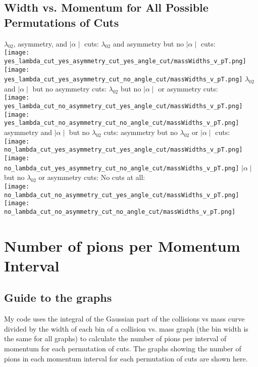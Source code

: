 \documentclass[11pt]{article}
\begin{document}
\subsection{Width vs. Momentum for All Possible Permutations of Cuts}%
\begin{frame}{}
$\lambda_{02}$, asymmetry, and $\mid\alpha\mid$ cuts:
\noindent\hspace{1 cm}$\lambda_{02}$ and asymmetry but no $\mid\alpha\mid$ cuts:\\
\texttt{[image: yes\_lambda\_cut\_yes\_asymmetry\_cut\_yes\_angle\_cut/massWidths\_v\_pT.png]}
\texttt{[image: yes\_lambda\_cut\_yes\_asymmetry\_cut\_no\_angle\_cut/massWidths\_v\_pT.png]}
$\lambda_{02}$ and $\mid\alpha\mid$ but no asymmetry cuts:
\noindent\hspace{1 cm}$\lambda_{02}$ but no $\mid\alpha\mid$ or asymmetry cuts:\\
\texttt{[image: yes\_lambda\_cut\_no\_asymmetry\_cut\_yes\_angle\_cut/massWidths\_v\_pT.png]}
\texttt{[image: yes\_lambda\_cut\_no\_asymmetry\_cut\_no\_angle\_cut/massWidths\_v\_pT.png]}
asymmetry and $\mid\alpha\mid$ but no $\lambda_{02}$ cuts:
\noindent\hspace{1 cm}asymmetry but no $\lambda_{02}$ or $\mid\alpha\mid$ cuts:\\
\texttt{[image: no\_lambda\_cut\_yes\_asymmetry\_cut\_yes\_angle\_cut/massWidths\_v\_pT.png]}
\texttt{[image: no\_lambda\_cut\_yes\_asymmetry\_cut\_no\_angle\_cut/massWidths\_v\_pT.png]}
$\mid\alpha\mid$ but no $\lambda_{02}$ or asymmetry cuts:
\noindent\hspace{1 cm} No cuts at all:\\
\texttt{[image: no\_lambda\_cut\_no\_asymmetry\_cut\_yes\_angle\_cut/massWidths\_v\_pT.png]}
\texttt{[image: no\_lambda\_cut\_no\_asymmetry\_cut\_no\_angle\_cut/massWidths\_v\_pT.png]}
\end{frame}

\section{Number of pions per Momentum Interval} %
\subsection{Guide to the graphs} %
My code uses the integral of the Gaussian part of the collisions vs mass curve divided by the width of each bin of a collision vs. mass graph (the bin width is the same for all graphs) to calculate the number of pions per interval of momentum for each permutation of cuts. The graphs showing the number of pions in each momentum interval for each permutation of cuts are shown here.
\end{document}
